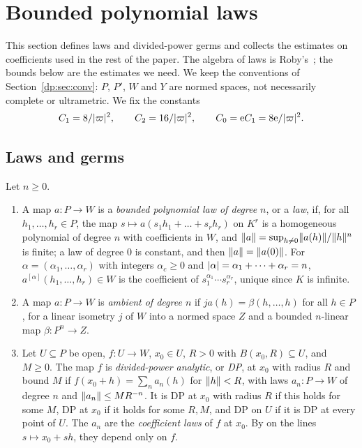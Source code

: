 \section{Bounded polynomial laws}\label{dp:sec:laws}

This section defines laws and divided-power germs and collects the estimates on coefficients used in the rest of the paper. The algebra of laws is Roby's~\cite{Ro}; the bounds below are the estimates we need. We keep the conventions of Section~\ref{dp:sec:conv}: $P$, $P'$, $W$ and $Y$ are normed spaces, not necessarily complete or ultrametric. We fix the constants
\[
 C_1=8/\lvert \varpi\rvert^2,\qquad C_2=16/\lvert \varpi\rvert^2,\qquad C_0=\mathrm eC_1=8\mathrm e/\lvert \varpi\rvert^2.
\]

\subsection{Laws and germs}

\begin{definition}\label{dp:def:laws}
Let $n\ge0$.
\begin{enumerate}
\item A map $a\colon P\to W$ is a \emph{bounded polynomial law of degree $n$}, or a \emph{law}, if, for all $h_1,\dots,h_r\in P$, the map $s\mapsto a(s_1h_1+\dots+s_rh_r)$ on $K^r$ is a homogeneous polynomial of degree $n$ with coefficients in $W$, and $\lVert a\rVert=\sup_{h\ne0}\lVert a(h)\rVert/\lVert h\rVert^n$ is finite; a law of degree $0$ is constant, and then $\lVert a\rVert=\lVert a(0)\rVert$. For $\alpha=(\alpha_1,\dots,\alpha_r)$ with integers $\alpha_c\ge0$ and $\lvert \alpha\rvert=\alpha_1+\dots+\alpha_r=n$, $a^{[\alpha]}(h_1,\dots,h_r)\in W$ is the coefficient of $s_1^{\alpha_1}\cdots s_r^{\alpha_r}$, unique since $K$ is infinite.
\item A map $a\colon P\to W$ is \emph{ambient of degree $n$} if $ja(h)=\beta(h,\dots,h)$ for all $h\in P$, for a linear isometry $j$ of $W$ into a normed space $Z$ and a bounded $n$\nobreakdash-linear map $\beta\colon P^n\to Z$.
\item Let $U\subseteq P$ be open, $f\colon U\to W$, $x_0\in U$, $R>0$ with $B(x_0,R)\subseteq U$, and $M\ge0$. The map $f$ is \emph{divided-power analytic}, or \emph{DP}, at $x_0$ with radius $R$ and bound $M$ if $f(x_0+h)=\sum_na_n(h)$ for $\lVert h\rVert<R$, with laws $a_n\colon P\to W$ of degree $n$ and $\lVert a_n\rVert\le MR^{-n}$. It is DP at $x_0$ with radius $R$ if this holds for some $M$, DP at $x_0$ if it holds for some $R,M$, and DP on $U$ if it is DP at every point of $U$. The $a_n$ are the \emph{coefficient laws} of $f$ at $x_0$. By \cite[Lemma~A.1]{I} on the lines $s\mapsto x_0+sh$, they depend only on $f$.
\end{enumerate}
\end{definition}

